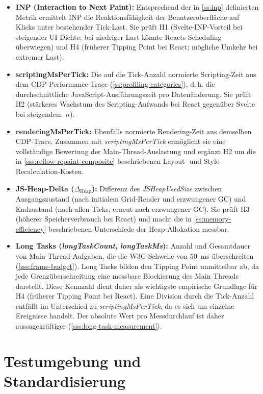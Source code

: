 \begin{itemize}
	\item \textbf{INP (Interaction to Next Paint):} Entsprechend der in \cref{ss:inp} definierten Metrik ermittelt INP die Reaktionsfähigkeit der Benutzeroberfläche auf Klicks unter bestehender Tick-Last. Sie prüft H1 (Svelte-INP-Vorteil bei steigender UI-Dichte; bei niedriger Last könnte Reacts Scheduling überwiegen)  und H4 (früherer Tipping Point bei React; mögliche Umkehr bei    
	extremer Last).
	\item \textbf{scriptingMsPerTick:} Die auf die Tick-Anzahl normierte Scripting-Zeit aus dem CDP-Performance-Trace (\cref{ss:profiling-categories}), d.\,h. die durchschnittliche JavaScript-Ausführungszeit pro Datenänderung. Sie prüft H2 (stärkeres Wachstum des Scripting-Aufwands bei React gegenüber Svelte bei steigendem~$n$).
	\item \textbf{renderingMsPerTick:} Ebenfalls normierte Rendering-Zeit aus demselben CDP-Trace. Zusammen mit \textit{scriptingMsPerTick} ermöglicht sie eine vollständige Bewertung der Main-Thread-Auslastung und ergänzt H2 um die in \cref{sss:reflow-repaint-composite} beschriebenen Layout- und Style-Recalculation-Kosten. 
	\item \textbf{JS-Heap-Delta ($\Delta_{\mathrm{Heap}}$):} Differenz des \textit{JSHeapUsedSize} zwischen Ausgangszustand (nach initialem Grid-Render und erzwungener GC) und Endzustand (nach allen Ticks, erneut nach erzwungener GC). Sie prüft H3 (höherer Speicherverbrauch bei React) und macht die in \cref{ss:memory-efficiency} beschriebenen Unterschiede der Heap-Allokation messbar.
    \item \textbf{Long Tasks (\textit{longTaskCount}, \textit{longTaskMs}):} Anzahl und Gesamtdauer von Main-Thread-Aufgaben, die die W3C-Schwelle von \qty{50}{ms} überschreiten (\cref{sss:frame-budget}). Long Tasks bilden den Tipping Point unmittelbar ab, da jede Grenzüberschreitung eine messbare Blockierung des Main Threads darstellt. Diese Kennzahl dient daher als wichtigste empirische Grundlage für H4 (früherer Tipping Point bei React). Eine Division durch die Tick-Anzahl entfällt im Unterschied zu \textit{scriptingMsPerTick}, da es sich um einzelne Ereignisse handelt. Der absolute Wert pro Messdurchlauf ist daher aussagekräftiger (\cref{sss:long-task-measurement}).
\end{itemize}


\section{Testumgebung und Standardisierung}
\label{s:test-environment}

